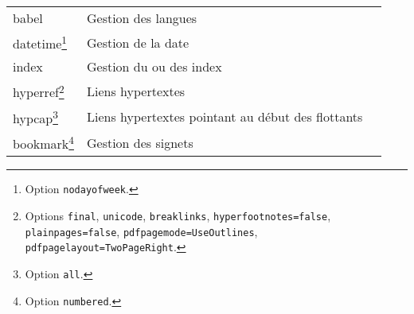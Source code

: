 \begin{tabular}{>{\sffamily}lll}
  babel                                                                                                                                                                                                                            & Gestion des langues                                                 \\
  datetime\footnote{Option \lstinline+nodayofweek+.}                                                                                                                                                                                       & Gestion de la date                                                  \\
  index                                                                                                                                                                                                                            & Gestion du ou des index                                             \\
  hyperref\footnote{Options \lstinline+final+, \lstinline+unicode+,
    \lstinline+breaklinks+, \lstinline+hyperfootnotes=false+,
    \lstinline+plainpages=false+,
    \lstinline+pdfpagemode=UseOutlines+, \lstinline+pdfpagelayout=TwoPageRight+.}   & Liens hypertextes                                                   \\
  hypcap\footnote{Option \lstinline+all+.}                                                                                                                                                                                                 & Liens hypertextes pointant au début des flottants                   \\
  bookmark\footnote{Option \lstinline+numbered+.}                                                                                                                                                                                          & Gestion des signets                                                 \\
\end{tabular}
